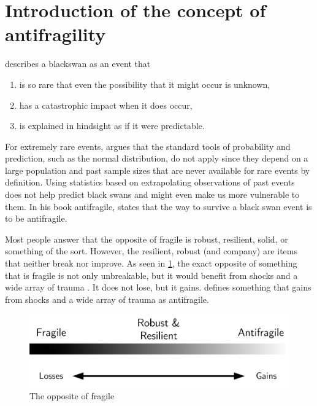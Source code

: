 \section{Introduction of the concept of antifragility}
\label{sec:introantifragility}
\textcite{Taleb2008} describes a \gls{blackswan} as an event that
\begin{enumerate}
	\item{is so rare that even the possibility that it might occur is unknown,}
	\item{has a catastrophic impact when it does occur,}
	\item{is explained in hindsight as if it were predictable.}
\end{enumerate}
For extremely rare events, \textcite{Taleb2008} argues that the standard tools of probability and prediction, such as the normal distribution, do not apply since they depend on a large population and past sample sizes that are never available for rare events by definition. Using statistics based on extrapolating observations of past events does not help predict black swans and might even make us more vulnerable to them. In his book \Gls{antifragile}, \textcite{Taleb2012} states that the way to survive a black swan event is to be \gls{antifragile}.

Most people answer that the opposite of \gls{fragile} is \gls{robust}, \gls{resilient}, solid, or something of the sort. However, the \gls{resilient}, \gls{robust} (and company) are items that neither break nor improve. As seen in \cref{fig:antifragilesimple}, the exact opposite of something that is \gls{fragile} is not only unbreakable, but it would benefit from shocks and a wide array of trauma \parencite{Taleb2012}. It does not lose, but it gains. \textcite{Taleb2012} defines something that gains from shocks and a wide array of trauma as \gls{antifragile}. 

\begin{figure}[h!]
	\centering
	\includegraphics[width=0.6\linewidth]{images/antifragilesimple}
	\caption[The opposite of fragile]{The opposite of fragile}
	\label{fig:antifragilesimple}
\end{figure}
